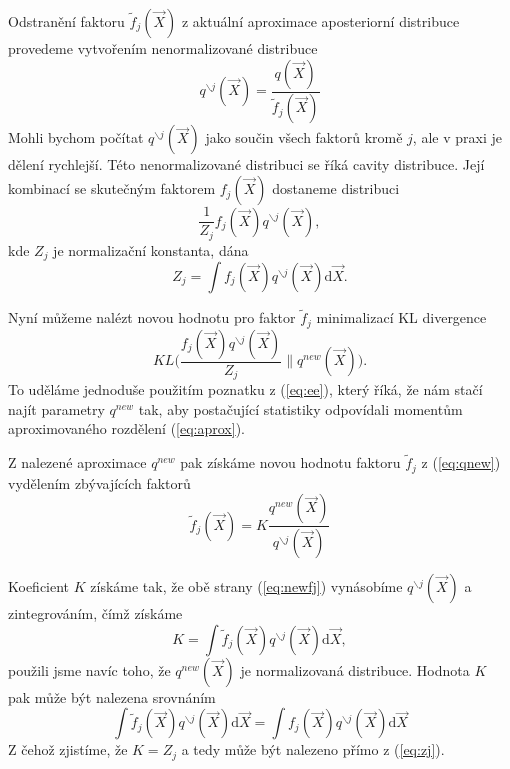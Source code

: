 Odstranění faktoru $\tilde{f}_j(\vec{X})$ z aktuální aproximace aposteriorní distribuce provedeme vytvořením nenormalizované distribuce
\begin{equation}
q^{\backslash j}(\vec{X}) = \frac{q(\vec{X})}{\tilde{f}_j(\vec{X})}
\end{equation}
Mohli bychom počítat $q^{\backslash j}(\vec{X})$ jako součin všech faktorů kromě $j$, ale v praxi je dělení rychlejší.
Této nenormalizované distribuci se říká cavity distribuce.
Její kombinací se skutečným faktorem $f_j(\vec{X})$ dostaneme distribuci
\begin{equation}
    \frac{1}{Z_j} f_j(\vec{X}) q^{\backslash j}(\vec{X}),
\label{eq:aprox}
\end{equation}
kde $Z_j$ je normalizační konstanta, dána
\begin{equation}
    Z_j = \int f_j(\vec{X}) q^{\backslash j}(\vec{X}) \mathrm{d}\vec{X}.
\label{eq:zj}
\end{equation}

Nyní můžeme nalézt novou hodnotu pro faktor $\tilde{f}_j$ minimalizací KL divergence
\begin{equation}
    KL\bigg(\frac{f_j(\vec{X}) q^{\backslash j}(\vec{X})}{Z_j} \bigg\| q^{new}(\vec{X})\bigg).
\end{equation}
To uděláme jednoduše použitím poznatku z (\ref{eq:ee}), který říká, že nám stačí najít parametry $q^{new}$ tak, aby postačující statistiky odpovídali momentům aproximovaného rozdělení (\ref{eq:aprox}).

Z nalezené aproximace $q^{new}$ pak získáme novou hodnotu faktoru $\tilde{f}_j$ z (\ref{eq:qnew}) vydělením zbývajících faktorů
\begin{equation}
    \tilde{f}_j(\vec{X}) = K \frac{q^{new}(\vec{X})}{q^{\backslash j}(\vec{X})}
\label{eq:newfj}
\end{equation}

Koeficient $K$ získáme tak, že obě strany (\ref{eq:newfj}) vynásobíme $q^{\backslash j}(\vec{X})$ a zintegrováním, čímž získáme
\begin{equation}
    K = \int \tilde{f}_j(\vec{X}) q^{\backslash j}(\vec{X}) \mathrm{d}\vec{X},
\end{equation}
použili jsme navíc toho, že $q^{new}(\vec{X})$ je normalizovaná distribuce.
Hodnota $K$ pak může být nalezena srovnáním
\begin{equation}
    \int \tilde{f}_j (\vec{X}) q^{\backslash j}(\vec{X}) \mathrm{d}\vec{X} = \int f_j(\vec{X}) q^{\backslash j}(\vec{X}) \mathrm{d}\vec{X}
\end{equation}
Z čehož zjistíme, že $K = Z_j$ a tedy může být nalezeno přímo z (\ref{eq:zj}).

